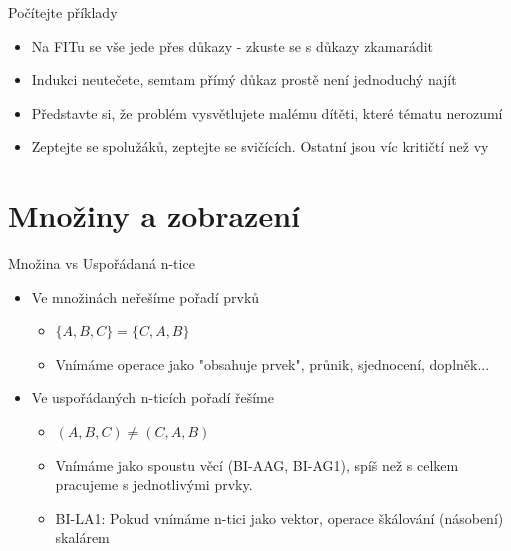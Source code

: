 \documentclass[aspectratio=1610]{beamer}
\begin{document}
\begin{frame}{Počítejte příklady}

\begin{itemize}
  \item Na FITu se vše jede přes důkazy - zkuste se s důkazy zkamarádit
  \item Indukci neutečete, semtam přímý důkaz prostě není jednoduchý najít
  \item Představte si, že problém vysvětlujete malému dítěti, které tématu nerozumí
  \item Zeptejte se spolužáků, zeptejte se svičících. Ostatní jsou víc kritičtí než vy
\end{itemize}


\end{frame}

\section{Množiny a zobrazení}

\begin{frame}{Množina vs Uspořádaná n-tice}

\begin{itemize}
  \item Ve množinách neřešíme pořadí prvků \begin{itemize}
      \item $\{A, B, C\} = \{C, A, B\}$
      \item Vnímáme operace jako "obsahuje prvek", průnik, sjednocení, doplněk...
    \end{itemize}
  \item Ve uspořádaných n-ticích pořadí řešíme \begin{itemize}
      \item $(A, B, C) \neq (C, A, B)$
      \item Vnímáme jako spoustu věcí (BI-AAG, BI-AG1), spíš než s celkem pracujeme s jednotlivými prvky.
      \item BI-LA1: Pokud vnímáme n-tici jako vektor, operace škálování (násobení) skalárem
    \end{itemize}
\end{itemize}

\end{frame}
\end{document}
